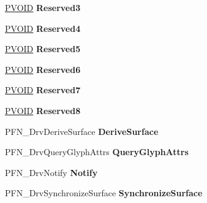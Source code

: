 \begin{DoxyCompactItemize}
\hyperlink{interfacevoid}{P\+V\+O\+ID} {\bfseries Reserved3}
\item 
\mbox{\label{struct___d_r_i_v_e_r___f_u_n_c_t_i_o_n_s_a4803a84119923a9839ebc141c350171d}} 
\hyperlink{interfacevoid}{P\+V\+O\+ID} {\bfseries Reserved4}
\item 
\mbox{\label{struct___d_r_i_v_e_r___f_u_n_c_t_i_o_n_s_a6840f0025373c80007d6b3a844685df1}} 
\hyperlink{interfacevoid}{P\+V\+O\+ID} {\bfseries Reserved5}
\item 
\mbox{\label{struct___d_r_i_v_e_r___f_u_n_c_t_i_o_n_s_a2f0b92a9dd7a765327b7a7f43c414fc4}} 
\hyperlink{interfacevoid}{P\+V\+O\+ID} {\bfseries Reserved6}
\item 
\mbox{\label{struct___d_r_i_v_e_r___f_u_n_c_t_i_o_n_s_a884cc7f91ef1adb8064ae57a8092ec28}} 
\hyperlink{interfacevoid}{P\+V\+O\+ID} {\bfseries Reserved7}
\item 
\mbox{\label{struct___d_r_i_v_e_r___f_u_n_c_t_i_o_n_s_ac2446002cdbce7c3c1d712fe2165018a}} 
\hyperlink{interfacevoid}{P\+V\+O\+ID} {\bfseries Reserved8}
\item 
\mbox{\label{struct___d_r_i_v_e_r___f_u_n_c_t_i_o_n_s_ac17bda22ce2abaa0a06279aab73ec85d}} 
P\+F\+N\+\_\+\+Drv\+Derive\+Surface {\bfseries Derive\+Surface}
\item 
\mbox{\label{struct___d_r_i_v_e_r___f_u_n_c_t_i_o_n_s_a6c2786443f044ce7d4ca725590fecf75}} 
P\+F\+N\+\_\+\+Drv\+Query\+Glyph\+Attrs {\bfseries Query\+Glyph\+Attrs}
\item 
\mbox{\label{struct___d_r_i_v_e_r___f_u_n_c_t_i_o_n_s_af8df11c1f4de6026762169759273c6f7}} 
P\+F\+N\+\_\+\+Drv\+Notify {\bfseries Notify}
\item 
\mbox{\label{struct___d_r_i_v_e_r___f_u_n_c_t_i_o_n_s_aa15d7ff97ce088e18cbf71b5a41a944a}} 
P\+F\+N\+\_\+\+Drv\+Synchronize\+Surface {\bfseries Synchronize\+Surface}

\end{DoxyCompactItemize}
